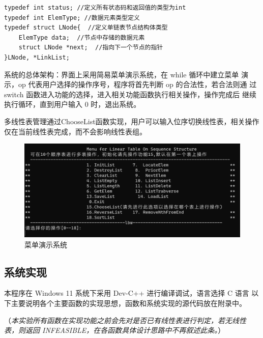 \documentclass[supercite]{Experimental_Report}
\theoremstyle{definition}
\begin{document}
\begin{lstlisting}[title = 相关数据结构定义]
typedef int status; //定义所有状态码和返回值的类型为int
typedef int ElemType; //数据元素类型定义
typedef struct LNode{  //定义单链表节点结构体类型
	ElemType data;  //节点中存储的数据元素
	struct LNode *next;  //指向下一个节点的指针
}LNode, *LinkList;

\end{lstlisting}


系统的总体架构：界面上采用简易菜单演示系统，在 while 循环中建立菜单
演示，op 代表用户选择的操作序号，程序将首先判断 op 的合法性，若合法则通
过 switch 函数进入功能的选择，进入相关功能函数执行相关操作，操作完成后
继续执行循环，直到用户输入 0 时，退出系统。

多线性表管理通过ChooseList函数实现，用户可以输入位序切换线性表，相关操作仅在当前线性表完成，而不会影响线性表组。
\begin{figure}[H]
	\centering
	\includegraphics[width=1\linewidth]{images/菜单设计.png}
	\caption{菜单演示系统}
	\label{fig1-1}
\end{figure}
\subsection{系统实现}
本程序在 Windows 11 系统下采用 Dev-C++ 进行编译调试，语言选择 C 语言
以下主要说明各个主要函数的实现思想，函数和系统实现的源代码放在附录中。

（\emph{本实验所有函数在实现功能之前会先对是否已有线性表进行判定，若无线性
表，则返回 INFEASIBLE，在各函数具体设计思路中不再叙述此条。}）
\end{document}
